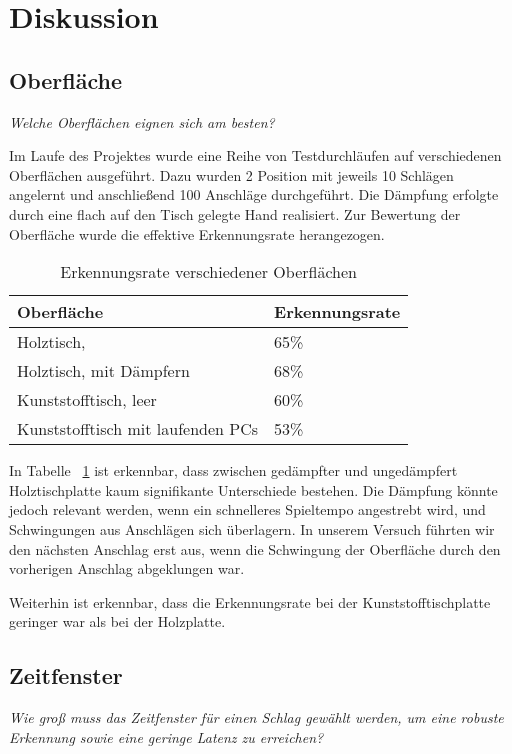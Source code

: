 \section{Diskussion}

\subsection*{Oberfläche}
\textit{Welche Oberflächen eignen sich am besten?}

Im Laufe des Projektes wurde eine Reihe von Testdurchläufen auf verschiedenen Oberflächen ausgeführt. Dazu wurden 2 Position mit jeweils 10 Schlägen angelernt und anschließend 100 Anschläge durchgeführt. Die Dämpfung erfolgte durch eine flach auf den Tisch gelegte Hand realisiert. Zur Bewertung der Oberfläche wurde die effektive Erkennungsrate herangezogen.


\begin{table}[h]   
	\centering
     
     \caption{Erkennungsrate verschiedener Oberflächen}
     \label{tab:surf}
\begin{tabular}{l l}
Oberfläche & Erkennungsrate \\
\hline
Holztisch, & 65\% \\
Holztisch, mit Dämpfern & 68\% \\
Kunststofftisch, leer & 60\% \\
Kunststofftisch mit laufenden PCs & 53\% \\

\end{tabular}
\end{table}



In Tabelle ~\ref{tab:surf} ist erkennbar, dass zwischen gedämpfter und ungedämpfert Holztischplatte kaum signifikante Unterschiede bestehen. Die Dämpfung könnte jedoch relevant werden, wenn ein schnelleres Spieltempo angestrebt wird, und Schwingungen aus Anschlägen sich überlagern. In unserem Versuch führten wir den nächsten Anschlag erst aus, wenn die Schwingung der Oberfläche durch den vorherigen Anschlag abgeklungen war.

Weiterhin ist erkennbar, dass die Erkennungsrate bei der Kunststofftischplatte geringer war als bei der Holzplatte.


\subsection*{Zeitfenster}
\textit{Wie groß muss das Zeitfenster für einen Schlag gewählt werden, um eine robuste Erkennung sowie eine geringe Latenz zu erreichen?}

